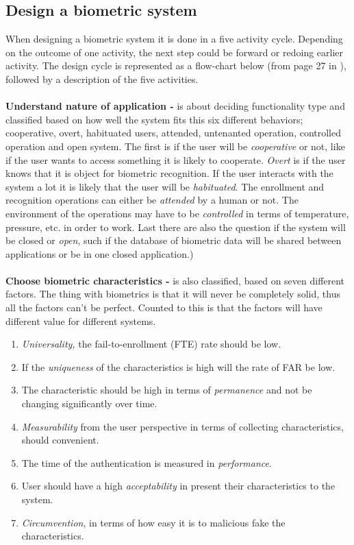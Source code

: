 \subsection{Design a biometric system}
When designing a biometric system it is done in a five activity cycle. Depending on the outcome of one activity, the next step could be forward or redoing earlier activity. The design cycle is represented as a flow-chart below (from page 27 in \cite[]{introbio}), followed by a description of the five activities. \\
\\
\textbf{Understand nature of application -} is about deciding functionality type and classified based on how well the system fits this six different behaviors; cooperative, overt, habituated users, attended, untenanted operation, controlled operation and open system. The first is if the user will be \textit{cooperative} or not, like if the user wants to access something it is likely to cooperate. \textit{Overt} is if the user knows that it is object for biometric recognition. If the user interacts with the system a lot it is likely that the user will be \textit{habituated}. The enrollment and recognition operations can either be \textit{attended} by a human or not. The environment of the operations may have to be \textit{controlled} in terms of temperature, pressure, etc. in order to work. Last there are also the question if the system will be closed or \textit{open}, such if the database of biometric data will be shared between applications or be in one closed application.) \\
\\
\textbf{Choose biometric characteristics -}\label{auth:bio:character} is also classified, based on seven different factors. The thing with biometrics is that it will never be completely solid, thus all the factors can't be perfect. Counted to this is that the factors will have different value for different systems.
\begin{enumerate}
	\item \textit{Universality,} the fail-to-enrollment (FTE) rate should be low.
	\item If the \textit{uniqueness} of the characteristics is high will the rate of FAR be low. 
	\item The characteristic should be high in terms of \textit{permanence} and not be changing significantly over time.
	\item \textit{Measurability} from the user perspective in terms of collecting characteristics, should convenient.
	\item The time of the authentication is measured in \textit{performance}.
	\item User should have a high \textit{acceptability} in present their characteristics to the system.
	\item \textit{Circumvention}, in terms of how easy it is to malicious fake the characteristics.
\end{enumerate} 

